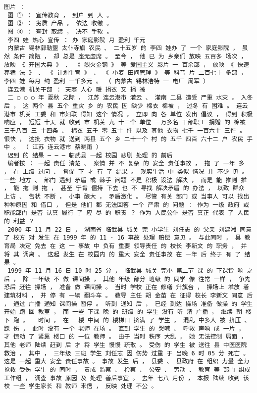 \documentclass{article}
\begin{document}
\begin{Verbatim}[commandchars=\\\{\}]
 图片 ： 
 图 ① ： 宣传教育 ， 到户 到 人 。 
 图 ② ： 劣质 产品 ， 依法 收缴 。 
 图 ③ ： 查封 取缔 ， 决不 手软 。 
 李四 娃 热心 宣传 ： 办 家庭影院 月 盈利 千元 
 内蒙古 锡林郭勒盟 太仆寺旗 农民 、 二十五岁 的 李四 娃办 了 一个 家庭影院 ， 虽然 条件 简陋 ， 却 总是 座无虚席 。 至今 ， 他 已 为 乡亲们 放映 五百多 场次 ， 放映 《 开国大典 》 、 《 烈火金钢 》 等 爱国主义 影片 一 百余部 ， 放映 《 快速 养猪 法 》 、 《 计划生育 》 、 《 小麦 田间管理 》 等 科普 片 二百七十 多部 ， 李四 娃 每月 纯 盈利 一千多元 。 （ 内蒙古 锡林浩特 一 电厂 周军 ） 
 连云港 机关干部 ： 天寒 人心 暖 捐衣 又 捐 被 
 二 ○ ○ ○ 年 夏秋 之际 ， 江苏 连云港市 灌云 、 灌南 二县 遭受 严重 水灾 。 入冬 后 ， 这 两个 县 五个 重灾 乡 的 农民 因 缺少 棉衣 棉被 ， 过冬 有 困难 。 连云港市 机关 工委 和 市妇联 得知 这个 情况 ， 立即 向 各 单位 发出 倡议 ， 得到 积极响应 ， 短短 十天 就 收到 市 机关 九 十三个 单位 一万多名 干部职工 捐赠 的 棉被 三千八百 三 十四条 、 棉衣 五千 零 五十 件 以及 其他 衣物 七千 一百六十 三件 。 很快 ， 这批 衣物 就 送到 两县 五个 乡 二十一个 村 的 五千 四百 六十二 户 农民 手中 。 （ 江苏 连云港市 蔡晓雨 ） 
 迟到 的 结果 — — — 临武县 一起 校园 悲剧 处理 的 前后 
 编者按 ： 一起 责任 清楚 、 案情 并 不 复杂 的 安全 责任事故 ， 拖 了 一年 多 ， 在 上级 过问 、 督促 下 才 有 了 结果 。 现实生活 中 类似 情况 并 不少 见 。 一些 地方 、 部门 遇到 矛盾 或 棘手 问题 不是 积极 设法 解决 ， 而是 能 推则 推 ， 能 拖 则 拖 ， 甚至 宁肯 僵持 下去 也 不 寻找 解决矛盾 的 办法 ， 以致 群众 上访 、 告状 不断 ， 小事 酿大 ， 矛盾激化 。 尽管 有关 部门 或 当事人 可以 找出 种种原因 和 借口 ， 但是 他们 都 无法回答 一个 严肃 的 问题 ： 作为 一级 政府 或 职能部门 是否 认真 履行 了 应 尽 的 职责 ？ 作为 人民公仆 是否 真正 代表 了 人民 的 利益 ？ 
 2000 年 11 月 22 日 ， 湖南省 临武县 城关 完 小学生 刘任志 的 父亲 刘建湘 同意 了 校方 对 发生 在 1999 年 的 11 · 16 事故 处理 赔偿 意见 。 与此同时 ， 县 教育局 决定 免去 在 这 一 事故 中 负有 重要 领导责任 的 校长 李新文 的 职务 ， 并 将 其 调离 。 这起 发生 在 校园内 的 重大 安全 责任事故 在 一年 后 终于 有 了 结果 。 
 1999 年 11 月 16 日 10 时 25 分 ， 临武县 城关 完小 第二节 课 的 下课铃 响 之后 ， 除 一年级 不 做 课间操 ， 其他 年级 部分 班级 的 同学 像 往常 一样 ， 争先恐后 赶往 操场 ， 准备 做 课间操 。 当时 学校 正在 修缮 升旗台 ， 操场上 堆放 着 建筑材料 ， 并 停 有 一辆 翻斗车 。 教导 主任 胡 金苗 在 征得 校长 李新文 同意 后 ， 通过 广播 通知 课间操 暂停 。 听到 通知 后 ， 已经 到达 操场 准备 做操 的 学生 开始 跑 回 教室 ， 而 一些 下课 晚 的 班级 的 学生 没有 听 清 广播 ， 继续 朝 楼下 跑 。 一时间 ， 在 一楼 中间 的 楼梯口 挤满 了 学生 ， 混乱 中多人 被 挤压 、 踩 伤 ， 此时 没有 一个 老师 在场 。 直到 学生 的 哭喊 、 呼救 声响 成 一片 ， 才 惊动 了 紧靠 楼口 的 一位 教师 。 由于 当时 秩序 大乱 ， 她 无法控制 局面 ， 其他 老师 陆续 赶到 后 才 将 学生 慢慢 疏散 。 受伤 的 学生 被 送往 县 中医医院 救治 ， 其中 ， 三年级 三班 学生 刘任志 因 伤势 过重 于 当晚 6 时 05 分 死亡 。 这是 一起 重大 安全 责任事故 。 事故 发生 后 ， 县委 、 县政府 在 组织 力量 全力 抢救 受伤 学生 的 同时 ， 责成 监察 、 检察 、 公安 、 劳动 、 教育 等 部门 组成 工作组 ， 调查 事故 原因 及 处理 善后事宜 。 去年 七八 月份 ， 本报 陆续 收到 该校 一些 学生家长 和 教师 来信 ， 反映 处理 不公 。 

\end{Verbatim}
\end{document}

